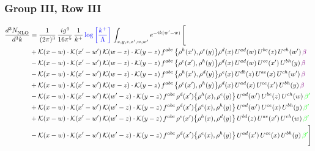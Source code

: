 \documentclass[9pt]{article}
\numberwithin{equation}{section}
\begin{document}
\subsubsection{Group III, Row III} 
\begin{align}
     \frac{d^{3}N_{\rm NLO}^{\rm}}{d^{3}k}  & = \frac{1}{(2\pi)^{3}}\, \frac{ig^{4}}{16\pi^{5}}\, \frac{1}{k^{+}}\, {\color{blue}\log{\left[\frac{k^{+}}{\Lambda}\right]}}\, \int_{x,y,z,x^{\prime},w,w^{\prime}}e^{-ik(w^{\prime}-w)}\, \Bigg[\notag \\ & +\mathcal{K}(x-w)\cdot\mathcal{K}(x'-w')\,\mathcal{K}(w-z)\cdot\mathcal{K}(y-z)\, f^{abc}\,\big\{\rho^{h}(x'),\rho^{e}(y)\big\}\rho^{d}(x)\,U^{ad}(w)\,U^{be}(z)\,U^{ch}(w')\,{\color{violet}\beta}\notag\\
&-\mathcal{K}(x-w)\cdot\mathcal{K}(x'-w')\,\mathcal{K}(w-z)\cdot\mathcal{K}(y-z)\, f^{abc}\,\big\{\rho^{e}(x'),\rho^{h}(y)\big\}\rho^{d}(x)\,U^{ad}(w)\,U^{ce}(x')\,U^{bh}(y)\,{\color{violet}\beta}\notag\\ & -\mathcal{K}(x-w)\cdot\mathcal{K}(x'-w')\,\mathcal{K}(w-z)\cdot\mathcal{K}(y-z)\, f^{abc}\,\big\{\rho^{h}(x'),\rho^{d}(y)\big\}\rho^{e}(x)\,U^{db}(z)\,U^{ae}(x)\,U^{ch}(w')\,{\color{violet}\beta}\notag\\ & +\mathcal{K}(x-w)\cdot\mathcal{K}(x'-w')\,\mathcal{K}(w-z)\cdot\mathcal{K}(y-z)\, f^{abc}\,\big\{\rho^{e}(x'),\rho^{h}(y)\big\}\rho^{d}(x)\,U^{ad}(x)\,U^{ce}(x')\,U^{bh}(y)\,{\color{violet}\beta}\notag\\ & -\mathcal{K}(x-w)\cdot\mathcal{K}(x'-w')\,\mathcal{K}(w'-z)\cdot\mathcal{K}(y-z)\, f^{abc}\,\rho^{d}(x')\big\{\rho^{h}(x),\rho^{e}(y)\big\}\,U^{ad}(w')\,U^{be}(z)\,U^{ch}(w)\,{\color{green}\beta'}\notag\\ &+\mathcal{K}(x-w)\cdot\mathcal{K}(x'-w')\,\mathcal{K}(w'-z)\cdot\mathcal{K}(y-z)\, f^{abc}\,\rho^{d}(x')\big\{\rho^{e}(x),\rho^{h}(y)\big\}\,U^{ad}(w')\,U^{ce}(x)\,U^{bh}(y)\,{\color{green}\beta'} \notag\\ & +\mathcal{K}(x-w)\cdot\mathcal{K}(x'-w')\,\mathcal{K}(w'-z)\cdot\mathcal{K}(y-z)\, f^{abc}\,\rho^{e}(x')\big\{\rho^{h}(x),\rho^{d}(y)\big\}\,U^{bd}(z)\,U^{ae}(x')\,U^{ch}(w)\,{\color{green}\beta'} \notag\\ & -\mathcal{K}(x-w)\cdot\mathcal{K}(x'-w')\,\mathcal{K}(w'-z)\cdot\mathcal{K}(y-z)\, f^{abc}\,\rho^{d}(x')\big\{\rho^{e}(x),\rho^{h}(y)\big\}\,U^{ad}(x')\,U^{ce}(x)\,U^{bh}(y)\,{\color{green}\beta'}\Bigg]\end{align}     
\end{document}
